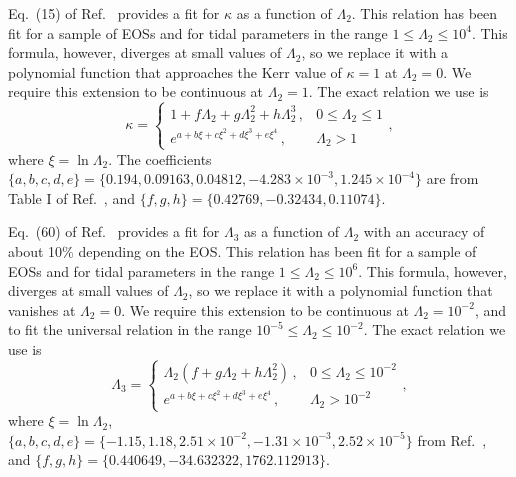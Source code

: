 \documentclass[prd,aps,letter,twocolumn,floatfix,notitlepage,nofootinbib]{revtex4-1}
\begin{document}
Eq.~(15) of Ref.~\cite{YagiYunes2017} provides a fit for $\kappa$ as a function of $\Lambda_2$. This relation has been fit for a sample of EOSs and for tidal parameters in the range $1 \leq \Lambda_2\leq10^4$. This formula, however, diverges at small values of $\Lambda_2$, so we replace it with a polynomial function that approaches the Kerr value of $\kappa = 1$ at $\Lambda_2 = 0$. We require this extension to be continuous at $\Lambda_2 = 1$. The exact relation we use is
\begin{equation}
\kappa = \left\{\begin{array}{ll}
1 + f \Lambda_2 + g \Lambda_2^2 + h \Lambda_2^3\, , & 0 \leq \Lambda_2 \le 1 \\
e^{a + b \xi + c \xi^2 + d \xi^3 + e \xi^4}\, , & \Lambda_2 > 1
\end{array}\right.,
\end{equation}
where $\xi = \ln\Lambda_2$. The coefficients $\{a, b, c, d, e\} = \{ 0.194, 0.09163, 0.04812, -4.283\times 10^{-3}, 1.245\times 10^{-4} \}$ are from Table I of Ref.~\cite{YagiYunes2017}, and $\{f, g, h\} = \{0.42769, -0.32434, 0.11074\}$.

Eq.~(60) of Ref.~\cite{Yagi:2013sva} provides a fit for $\Lambda_3$ as a function of $\Lambda_2$ with an accuracy of about 10\% depending on the EOS. This relation has been fit for a sample of EOSs and for tidal parameters in the range $1 \leq \Lambda_2\leq10^6$. This formula, however, diverges at small values of $\Lambda_2$, so we replace it with a polynomial function that vanishes at $\Lambda_2 = 0$. We require this extension to be continuous at $\Lambda_2 = 10^{-2}$, and to fit the universal relation in the range $10^{-5}\leq\Lambda_2\leq10^{-2}$. The exact relation we use is
\begin{equation}
\Lambda_3 = \left\{\begin{array}{ll}
\Lambda_2 (f + g \Lambda_2 + h \Lambda_2^2)\, , & 0 \leq \Lambda_2 \leq 10^{-2} \\
e^{a + b \xi + c \xi^2 + d \xi^3 + e \xi^4}\, , & \Lambda_2>10^{-2}
\end{array}\right.,
\end{equation}
where $\xi = \ln\Lambda_2$, $\{a, b, c, d, e\} = \{-1.15, 1.18, 2.51\times 10^{-2}, -1.31\times 10^{-3}, 2.52\times 10^{-5}\}$ from Ref.~\cite{Yagi:2013sva}, and $\{f, g, h\}=\{0.440649, -34.632322, 1762.112913\}$.
\end{document}
